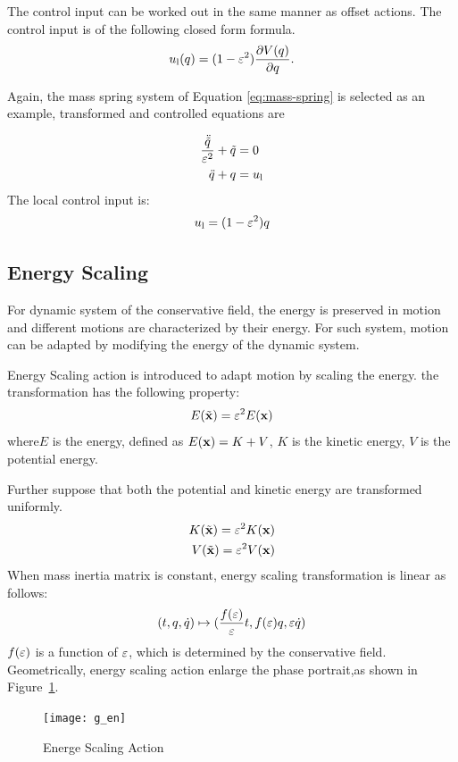 The control input can be worked out in the same manner as offset actions.
The control input is of the following closed form formula.
\begin{equation}
u_{\mathrm{l}}(q) = (1-\varepsilon^2) \frac{\partial V(q)}{\partial q}.
\end{equation}

Again, the mass spring system of Equation \ref{eq:mass-spring} is selected as an example, transformed and controlled equations are

\begin{align}
\frac{\ddot{\tilde{q}}}{\varepsilon^2}+\tilde{q}&=0 \nonumber \\
\ddot{q}+q&=u_{\mathrm{l}} \nonumber
\end{align}
The local control input is:
\[
u_{\mathrm{l}}=(1-\varepsilon^2)q
\]




\subsection*{Energy Scaling}
For dynamic system of the conservative field,
the energy is preserved in motion and different motions are characterized by their energy.
For such system, motion can be adapted by modifying the energy of the dynamic system.

Energy Scaling action is introduced to adapt motion by scaling the energy.
the transformation has the following property:
\[
E(\tilde{\mathbf{x}})=\varepsilon^2 E(\mathbf{x})
\]
 where$E$ is the energy, defined as $E(\mathbf{x})=K+V$,  $K$ is the kinetic energy,
$V$ is the potential energy.

Further suppose that both the potential and kinetic energy are transformed uniformly.
\begin{align}
K(\tilde{\mathbf{x}})=\varepsilon^2 K(\mathbf{x}) \nonumber\\
V(\tilde{\mathbf{x}})=\varepsilon^2 V(\mathbf{x}) \nonumber
\end{align}
When mass inertia matrix is constant, energy scaling transformation is linear as follows:
\[
(t,q,\dot{q} ) \mapsto ( \frac{f(\varepsilon)}{\varepsilon}t ,f(\varepsilon)q,\varepsilon\dot{q})
\]
$f(\varepsilon)$ is a function of $\varepsilon$, which is determined by the conservative field.
Geometrically, energy scaling action enlarge the phase portrait,as shown in Figure~\ref{fig:gen}.
\begin{figure}[!htbp]
  \begin{center}
      \texttt{[image: g\_en]}
    \caption{Energe Scaling Action}
    \label{fig:gen}
\end{center}
\end{figure}

